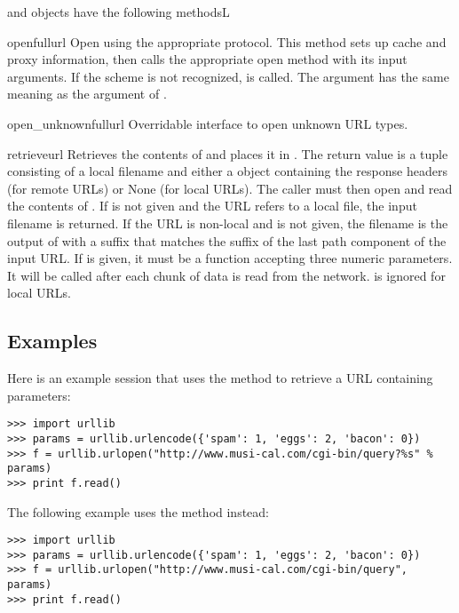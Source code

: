  and  objects have the
following methodsL

\begin{methoddesc}{open}{fullurl}
Open  using the appropriate protocol.  This method sets 
up cache and proxy information, then calls the appropriate open method with
its input arguments.  If the scheme is not recognized,
 is called.  The  argument 
has the same meaning as the  argument of .
\end{methoddesc}

\begin{methoddesc}{open_unknown}{fullurl}
Overridable interface to open unknown URL types.
\end{methoddesc}

\begin{methoddesc}{retrieve}{url}
Retrieves the contents of  and places it in .  The
return value is a tuple consisting of a local filename and either a
 object containing the response headers (for remote
URLs) or None (for local URLs).  The caller must then open and read the
contents of .  If  is not given and the URL
refers to a local file, the input filename is returned.  If the URL is
non-local and  is not given, the filename is the output of
 with a suffix that matches the suffix of the last
path component of the input URL.  If  is given, it must be
a function accepting three numeric parameters.  It will be called after each
chunk of data is read from the network.   is ignored for
local URLs.
\end{methoddesc}


\subsection{Examples}

Here is an example session that uses the  method to retrieve
a URL containing parameters:

\begin{verbatim}
>>> import urllib
>>> params = urllib.urlencode({'spam': 1, 'eggs': 2, 'bacon': 0})
>>> f = urllib.urlopen("http://www.musi-cal.com/cgi-bin/query?%s" % params)
>>> print f.read()
\end{verbatim}

The following example uses the  method instead:

\begin{verbatim}
>>> import urllib
>>> params = urllib.urlencode({'spam': 1, 'eggs': 2, 'bacon': 0})
>>> f = urllib.urlopen("http://www.musi-cal.com/cgi-bin/query", params)
>>> print f.read()
\end{verbatim}
